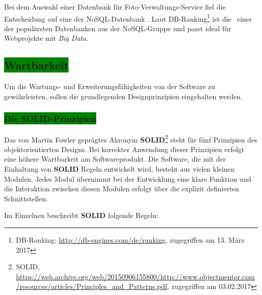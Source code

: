 Bei dem Auswahl einer Datenbank für Foto-Verwaltungs-Service fiel die Entscheidung auf eine der NoSQL-Datenbank \mongo. Laut DB-Ranking\footnote{DB-Ranking: \url{http://db-engines.com/de/ranking}, zugegriffen am 13. März 2017} ist die \mongo\ einer der populärsten Datenbanken aus der NoSQL-Gruppe und passt ideal für Webprojekte mit \textit{Big Data}.





\subsection{\colorbox{green}{Wartbarkeit}}\label{maintenance}

Um die Wartungs- und Erweiterungsfähigkeiten von der Software zu gewährleisten, sollen die grundlegenden Designprinzipien eingehalten werden.

\subsubsection{\colorbox{green}{Die SOLID-Prinzipien}}\label{solid}

Das von Martin Fowler geprägtes Akronym \textbf{SOLID}\footnote{SOLID, \url{https://web.archive.org/web/20150906155800/http://www.objectmentor.com/resources/articles/Principles_and_Patterns.pdf}, zugegriffen am 03.02.2017} steht für fünf Prinzipien des objektorientierten Designs. Bei korrekter Anwendung dieser Prinzipien erfolgt eine höhere Wartbarkeit am Softwareprodukt. Die Software, die mit der Einhaltung von \textbf{SOLID} Regeln entwickelt wird, besteht aus vielen kleinen Modulen. Jedes Modul übernimmt bei der Entwicklung eine klare Funktion und die Interaktion zwischen diesen Modulen erfolgt über die explizit definierten Schnittstellen.

Im Einzelnen beschreibt \textbf{SOLID} folgende Regeln:

